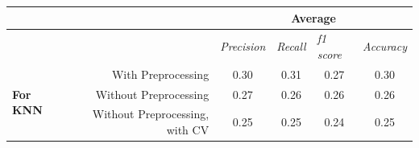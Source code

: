 \begin{table}[ht]
\centering
\begin{tabular}{@{}lrcccc@{}}
\toprule
                                                                  & \multicolumn{1}{l}{}                                        & \multicolumn{4}{c}{\textbf{Average}}                                                                                                                                              \\ \midrule
\multicolumn{1}{|l|}{}                                            & \multicolumn{1}{l|}{}                                       & \multicolumn{1}{l|}{\textit{Precision}}    & \multicolumn{1}{r|}{\textit{Recall}}       & \multicolumn{1}{l|}{\textit{f1 score}}     & \multicolumn{1}{l|}{\textit{Accuracy}}     \\ \midrule
\multicolumn{1}{|l|}{\multirow{5}{*}{\textbf{For KNN}}}           & \multicolumn{1}{r|}{With Preprocessing}                     & \multicolumn{1}{c|}{0.30}                  & \multicolumn{1}{c|}{0.31}                  & \multicolumn{1}{c|}{0.27}                  & \multicolumn{1}{c|}{0.30}                  \\ \cmidrule(l){2-6} 
\multicolumn{1}{|l|}{}                                            & \multicolumn{1}{r|}{\multirow{3}{*}{Without Preprocessing}} & \multicolumn{1}{c|}{\multirow{3}{*}{0.27}} & \multicolumn{1}{c|}{\multirow{3}{*}{0.26}} & \multicolumn{1}{c|}{\multirow{3}{*}{0.26}} & \multicolumn{1}{c|}{\multirow{3}{*}{0.26}} \\
\multicolumn{1}{|l|}{}                                            & \multicolumn{1}{r|}{}                                       & \multicolumn{1}{c|}{}                      & \multicolumn{1}{c|}{}                      & \multicolumn{1}{c|}{}                      & \multicolumn{1}{c|}{}                      \\
\multicolumn{1}{|l|}{}                                            & \multicolumn{1}{r|}{}                                       & \multicolumn{1}{c|}{}                      & \multicolumn{1}{c|}{}                      & \multicolumn{1}{c|}{}                      & \multicolumn{1}{c|}{}                      \\ \cmidrule(l){2-6} 
\multicolumn{1}{|l|}{}                                            & \multicolumn{1}{r|}{Without Preprocessing, with CV}         & \multicolumn{1}{c|}{0.25}                  & \multicolumn{1}{c|}{0.25}                  & \multicolumn{1}{c|}{0.24}                  & \multicolumn{1}{c|}{0.25}                  \\ \midrule

\end{tabular}
\end{table}
